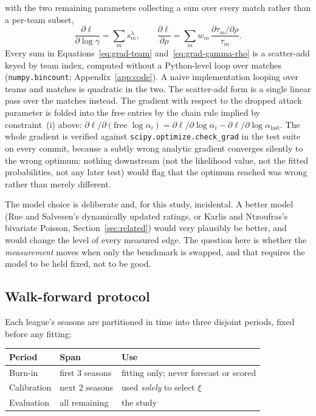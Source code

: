 \documentclass[11pt,a4paper]{article}
\begin{document}
with the two remaining parameters collecting a sum over every match rather
than a per-team subset,
\begin{equation}
  \frac{\partial\ell}{\partial\log\gamma} = \sum_m s^\lambda_m, \qquad
  \frac{\partial\ell}{\partial\rho} =
    \sum_m w_m\,\frac{\partial\tau_m/\partial\rho}{\tau_m}.
  \label{eq:grad-gamma-rho}
\end{equation}
Every sum in Equations~\eqref{eq:grad-team}
and~\eqref{eq:grad-gamma-rho} is a scatter-add keyed by team
index, computed without a Python-level loop over matches
(\texttt{numpy.bincount}; Appendix~\ref{app:code}). A naive implementation
looping over teams and matches is quadratic in the two. The scatter-add form
is a single linear pass over the matches instead. The gradient with respect
to the dropped attack parameter is
folded into the free entries by the chain rule implied by constraint~(i)
above: $\partial\ell/\partial(\text{free }\log\alpha_i) = \partial\ell/\partial
\log\alpha_i - \partial\ell/\partial\log\alpha_{\text{last}}$. The whole
gradient is verified against \texttt{scipy.optimize.check\_grad} in the test
suite on every commit, because a subtly wrong analytic gradient converges
silently to the wrong optimum: nothing downstream (not the likelihood
value, not the fitted probabilities, not any later test) would flag that
the optimum reached was wrong rather than merely different.

The model choice is deliberate and, for this study, incidental. A better model
(Rue and Salvesen's dynamically updated ratings, or Karlis and Ntzoufras's
bivariate Poisson, Section~\ref{sec:related}) would very plausibly be
better, and would change the level of every measured edge. The question here is
whether the \emph{measurement} moves when only the benchmark is swapped, and
that requires the model to be held fixed, not to be good.

\subsection{Walk-forward protocol}
\label{sec:walkforward}

Each league's seasons are partitioned in time into three disjoint periods,
fixed before any fitting:

\begin{center}
\begin{tabular}{lll}
  \toprule
  Period & Span & Use \\
  \midrule
  Burn-in     & first 3 seasons & fitting only; never forecast or scored \\
  Calibration & next 2 seasons  & used \emph{solely} to select $\xi$ \\
  Evaluation  & all remaining   & the study \\
  \bottomrule
\end{tabular}
\end{center}
\end{document}
